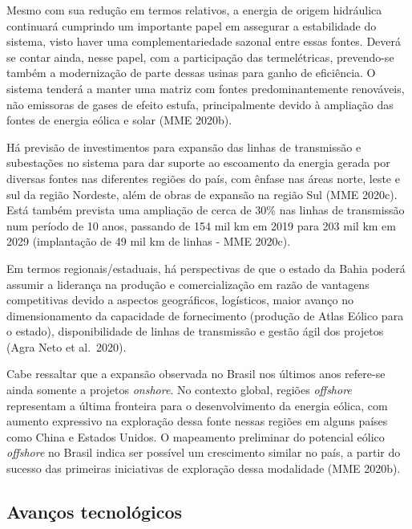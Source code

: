 \documentclass[
  oneside]{scrbook}
\begin{document}
Mesmo com sua redução em termos relativos, a energia de origem hidráulica continuará cumprindo um importante papel em assegurar a estabilidade do sistema, visto haver uma complementariedade sazonal entre essas fontes. Deverá se contar ainda, nesse papel, com a participação das termelétricas, prevendo-se também a modernização de parte dessas usinas para ganho de eficiência. O sistema tenderá a manter uma matriz com fontes predominantemente renováveis, não emissoras de gases de efeito estufa, principalmente devido à ampliação das fontes de energia eólica e solar (MME 2020b).

Há previsão de investimentos para expansão das linhas de transmissão e subestações no sistema para dar suporte ao escoamento da energia gerada por diversas fontes nas diferentes regiões do país, com ênfase nas áreas norte, leste e sul da região Nordeste, além de obras de expansão na região Sul (MME 2020c). Está também prevista uma ampliação de cerca de 30\% nas linhas de transmissão num período de 10 anos, passando de 154 mil km em 2019 para 203 mil km em 2029 (implantação de 49 mil km de linhas - MME 2020c).

Em termos regionais/estaduais, há perspectivas de que o estado da Bahia poderá assumir a liderança na produção e comercialização em razão de vantagens competitivas devido a aspectos geográficos, logísticos, maior avanço no dimensionamento da capacidade de fornecimento (produção de Atlas Eólico para o estado), disponibilidade de linhas de transmissão e gestão ágil dos projetos (Agra Neto et al.~2020).

Cabe ressaltar que a expansão observada no Brasil nos últimos anos refere-se ainda somente a projetos \emph{onshore}. No contexto global, regiões \emph{offshore} representam a última fronteira para o desenvolvimento da energia eólica, com aumento expressivo na exploração dessa fonte nessas regiões em alguns países como China e Estados Unidos. O mapeamento preliminar do potencial eólico \emph{offshore} no Brasil indica ser possível um crescimento similar no país, a partir do sucesso das primeiras iniciativas de exploração dessa modalidade (MME 2020b).

\hypertarget{avanuxe7os-tecnoluxf3gicos}{%
\subsection{Avanços tecnológicos}\label{avanuxe7os-tecnoluxf3gicos}}
\end{document}
